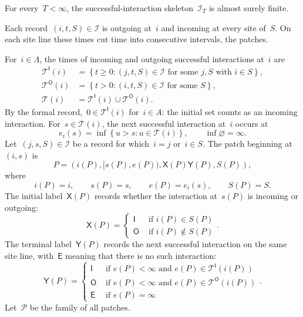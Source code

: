 \documentclass[EJP,preprint,NODS,nobera]{ejpecp}
\newcommand{\bb}[1]{\left(#1\right)}
\newcommand{\cb}[1]{\left\{#1\right\}}
\newcommand{\pw}[4]{\left\{\begin{array}{cl}
  #1 &\text{ if } #2 \\
  #3 &\text{ if } #4
\end{array}\right.}
\newcommand{\pwthree}[6]{\left\{\begin{array}{cl}
  #1 &\text{ if } #2 \\
  #3 &\text{ if } #4 \\
  #5 &\text{ if } #6
\end{array}\right.}
\newcommand{\chg}[1]{{\color{changegreen}#1}}
\begin{document}
\begin{lemma}
\label{lem:dual-local-finiteness}
For every~$T<\infty$, the successful-interaction skeleton~$\mathcal I_T$ is
almost surely finite.
\end{lemma}

\chg{Each record~$(i,t,S)\in\mathcal I$ is outgoing at~$i$ and incoming at every
site of~$S$. On each site line these times cut time into consecutive
intervals, the patches.}

\chg{\begin{definition}[Patch]
\label{def:patch}
For~$i\in\Lambda$, the times of incoming and outgoing successful interactions
at~$i$ are
\begin{align*}
\mathcal T^{\mathsf I}(i)
&=
\cb{t\geq0:(j,t,S)\in\mathcal I
  \text{ for some }j,S\text{ with }i\in S},
\\
\mathcal T^{\mathsf O}(i)
&=
\cb{t>0:(i,t,S)\in\mathcal I\text{ for some }S},
\\
\mathcal T(i)
&=
\mathcal T^{\mathsf I}(i)\cup\mathcal T^{\mathsf O}(i).
\end{align*}
By the formal record,~$0\in\mathcal T^{\mathsf I}(i)$ for~$i\in A$: the
initial set counts as an incoming interaction. For~$s\in\mathcal T(i)$, the
next successful interaction at~$i$ occurs at
\begin{equation*}
e_i(s)
=
\inf\cb{u>s:u\in\mathcal T(i)},
\qquad
\inf\varnothing=\infty.
\end{equation*}
Let~$(j,s,S)\in\mathcal I$ be a record for which~$i=j$ or~$i\in S$. The patch
beginning at~$(i,s)$ is
\begin{equation*}
P
=
\bb{i(P),[s(P),e(P)),\mathsf X(P)\mathsf Y(P),S(P)},
\end{equation*}
where
\begin{equation*}
i(P)=i,
\qquad
s(P)=s,
\qquad
e(P)=e_i(s),
\qquad
S(P)=S.
\end{equation*}
The initial label~$\mathsf X(P)$ records whether the interaction at~$s(P)$ is
incoming or outgoing:
\begin{equation*}
\mathsf X(P)
=
\pw{\mathsf I}{i(P)\in S(P)}{\mathsf O}{i(P)\notin S(P)}.
\end{equation*}
The terminal label~$\mathsf Y(P)$ records the next successful interaction on
the same site line, with~$\mathsf E$ meaning that there is no such interaction:
\begin{equation*}
\mathsf Y(P)
=
\pwthree
{\mathsf I}{e(P)<\infty\text{ and }e(P)\in\mathcal T^{\mathsf I}\bb{i(P)}}
{\mathsf O}{e(P)<\infty\text{ and }e(P)\in\mathcal T^{\mathsf O}\bb{i(P)}}
{\mathsf E}{e(P)=\infty}.
\end{equation*}
Let~$\mathcal P$ be the family of all patches.
\end{definition}}
\end{document}
